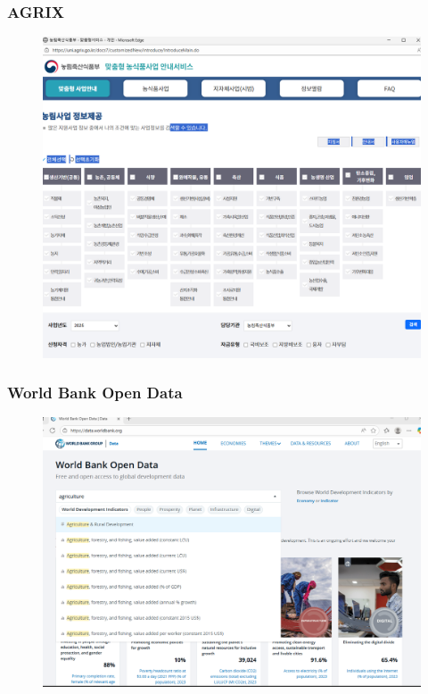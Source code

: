 \documentclass[
	11pt, %
]{beamer}
\begin{document}
\begin{frame}
	\frametitle{AGRIX}
	\begin{figure}
		\includegraphics[width=0.8\linewidth]{images/figure6.png}
		\label{fig}
	\end{figure}
\end{frame}

\begin{frame}
	\frametitle{World Bank Open Data}
	\begin{figure}
		\includegraphics[width=0.8\linewidth]{images/figure7.png}
		\label{fig}
	\end{figure}
\end{frame}
\end{document}
